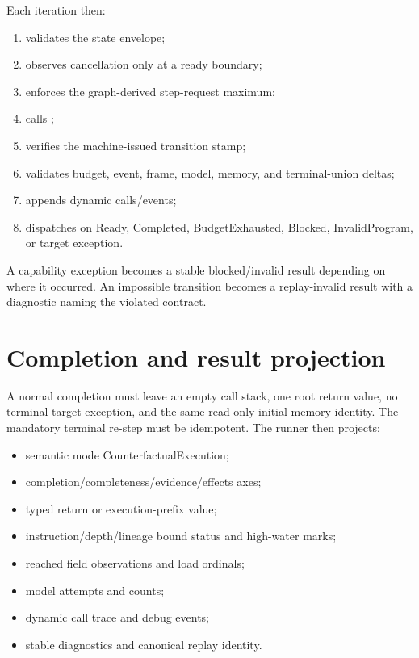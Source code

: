 \documentclass[11pt,oneside,openany]{book}
\newcommand{\typeName}[1]{\texttt{\detokenize{#1}}}
\newcommand{\truthmode}[1]{\textsf{#1}}
\newcommand{\status}[1]{\textsf{#1}}
\begin{document}
Each iteration then:

\begin{enumerate}
  \item validates the state envelope;
  \item observes cancellation only at a ready boundary;
  \item enforces the graph-derived step-request maximum;
  \item calls \typeName{StepOne};
  \item verifies the machine-issued transition stamp;
  \item validates budget, event, frame, model, memory, and terminal-union deltas;
  \item appends dynamic calls/events;
  \item dispatches on \status{Ready}, \status{Completed}, \status{BudgetExhausted}, \status{Blocked}, \status{InvalidProgram}, or target exception.
\end{enumerate}

A capability exception becomes a stable blocked/invalid result depending on where it occurred. An impossible transition becomes a replay-invalid result with a diagnostic naming the violated contract.

\section{Completion and result projection}

A normal completion must leave an empty call stack, one root return value, no terminal target exception, and the same read-only initial memory identity. The mandatory terminal re-step must be idempotent. The runner then projects:

\begin{itemize}
  \item semantic mode \truthmode{CounterfactualExecution};
  \item completion/completeness/evidence/effects axes;
  \item typed return or execution-prefix value;
  \item instruction/depth/lineage bound status and high-water marks;
  \item reached field observations and load ordinals;
  \item model attempts and counts;
  \item dynamic call trace and debug events;
  \item stable diagnostics and canonical replay identity.
\end{itemize}
\end{document}
